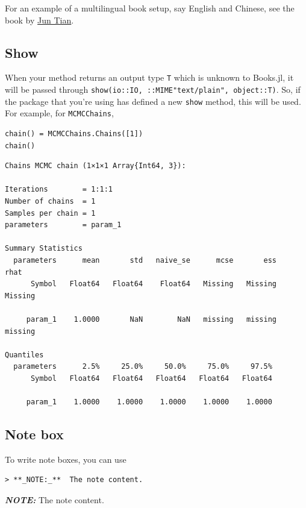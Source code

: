 \documentclass[
  14pt
  american,
  paper=a4,
  ,captions=tableheading
]{scrreprt}
\newcommand{\passthrough}[1]{#1}
\renewenvironment{quote}{\begin{customblockquote}\list{}{\rightmargin=0em\leftmargin=0em}%
\item\relax\color{blockquote-text}\ignorespaces}{\unskip\unskip\endlist\end{customblockquote}}
\begin{document}
For an example of a multilingual book setup, say English and Chinese,
see the book by
\href{https://github.com/LearnJuliaTheFunWay/LearnJuliaTheFunWay.jl}{Jun
Tian}.

\hypertarget{show}{%
\subsection{Show}\label{show}}

When your method returns an output type \passthrough{\lstinline!T!}
which is unknown to Books.jl, it will be passed through
\passthrough{\lstinline!show(io::IO, ::MIME"text/plain", object::T)!}.
So, if the package that you're using has defined a new
\passthrough{\lstinline!show!} method, this will be used. For example,
for \passthrough{\lstinline!MCMCChains!},

\begin{lstlisting}
chain() = MCMCChains.Chains([1])
chain()
\end{lstlisting}

\begin{lstlisting}
Chains MCMC chain (1×1×1 Array{Int64, 3}):

Iterations        = 1:1:1
Number of chains  = 1
Samples per chain = 1
parameters        = param_1

Summary Statistics
  parameters      mean       std   naive_se      mcse       ess      rhat
      Symbol   Float64   Float64    Float64   Missing   Missing   Missing

     param_1    1.0000       NaN        NaN   missing   missing   missing

Quantiles
  parameters      2.5%     25.0%     50.0%     75.0%     97.5%
      Symbol   Float64   Float64   Float64   Float64   Float64

     param_1    1.0000    1.0000    1.0000    1.0000    1.0000
\end{lstlisting}

\hypertarget{note-box}{%
\subsection{Note box}\label{note-box}}

To write note boxes, you can use

\begin{lstlisting}
> **_NOTE:_**  The note content.
\end{lstlisting}

\begin{quote}
\textbf{\emph{NOTE:}} The note content.
\end{quote}
\end{document}
